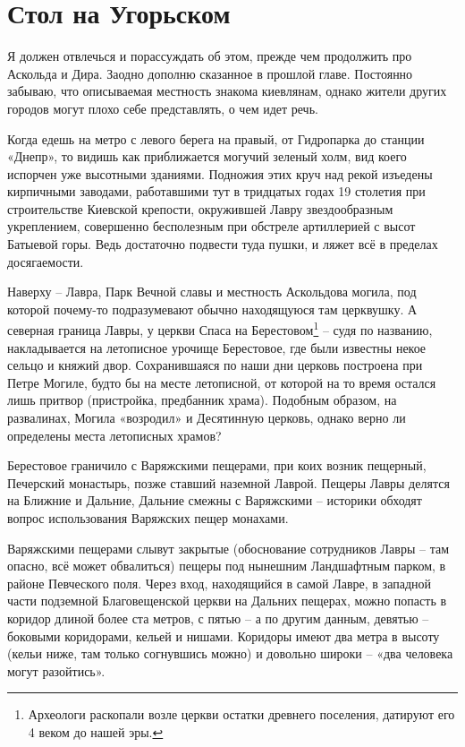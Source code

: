 \chapter{Стол на Угорьском}

Я должен отвлечься и порассуждать об этом, прежде чем продолжить про Аскольда и Дира. Заодно дополню сказанное в прошлой главе. Постоянно забываю, что описываемая местность знакома киевлянам, однако жители других городов могут плохо себе представлять, о чем идет речь.

Когда едешь на метро с левого берега на правый, от Гидропарка до станции «Днепр», то видишь как приближается могучий зеленый холм, вид коего испорчен уже высотными зданиями. Подножия этих круч над рекой изъедены кирпичными заводами, работавшими тут в тридцатых годах 19 столетия при строительстве Киевской крепости, окружившей Лавру звездообразным укреплением, совершенно бесполезным при обстреле артиллерией с высот Батыевой горы. Ведь достаточно подвести туда пушки, и ляжет всё в пределах досягаемости.

Наверху – Лавра, Парк Вечной славы и местность Аскольдова могила, под которой почему-то подразумевают обычно находящуюся там церквушку. А северная граница Лавры, у церкви Спаса на Берестовом\footnote{Археологи раскопали возле церкви остатки древнего поселения, датируют его 4 веком до нашей эры.} – судя по названию, накладывается на летописное урочище Берестовое, где были известны некое сельцо и княжий двор. Сохранившаяся по наши дни церковь построена при Петре Могиле, будто бы на месте летописной, от которой на то время остался лишь притвор (пристройка, предбанник храма). Подобным образом, на развалинах, Могила «возродил» и Десятинную церковь, однако верно ли определены места летописных храмов?

Берестовое граничило с Варяжскими пещерами, при коих возник пещерный, Печерский монастырь, позже ставший наземной Лаврой. Пещеры Лавры делятся на Ближние и Дальние, Дальние смежны с Варяжскими – историки обходят вопрос использования Варяжских пещер монахами.

Варяжскими пещерами слывут закрытые (обоснование сотрудников Лавры – там опасно, всё может обвалиться) пещеры под нынешним Ландшафтным парком, в районе Певческого поля. Через вход, находящийся в самой Лавре, в западной части подземной Благовещенской церкви на Дальних пещерах, можно попасть в коридор длиной более ста метров, с пятью – а по другим данным, девятью – боковыми коридорами, кельей и нишами. Коридоры имеют два метра в высоту (кельи ниже, там только согнувшись можно) и довольно широки – «два человека могут разойтись».

